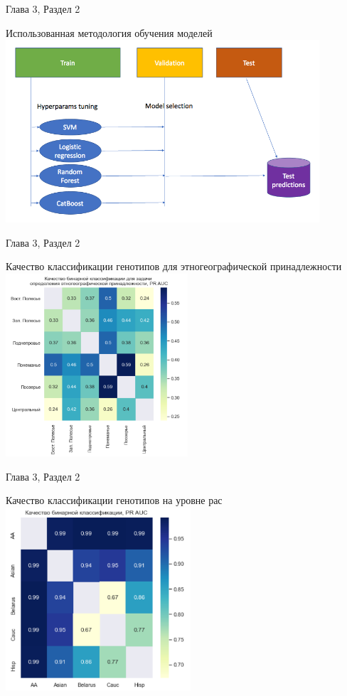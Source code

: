 \documentclass[8pt]{beamer}
\begin{document}
\begin{frame}{Глава 3, Раздел 2}
    \begin{block}{Использованная методология обучения моделей}
        \includegraphics[height=6.8cm]{images/ml_info.png}
        \centering
    \end{block}
\end{frame}

\begin{frame}{Глава 3, Раздел 2}
    \begin{block}{Качество классификации генотипов для этногеографической принадлежности}
        \includegraphics[height=6.8cm]{images/bel_reg_pr_auc.png}
        \centering
    \end{block}
\end{frame}

\begin{frame}{Глава 3, Раздел 2}
    \begin{block}{Качество классификации генотипов на уровне рас}
        \includegraphics[height=6.8cm]{images/bel_us_pr.png}
        \centering
    \end{block}
\end{frame}
\end{document}
